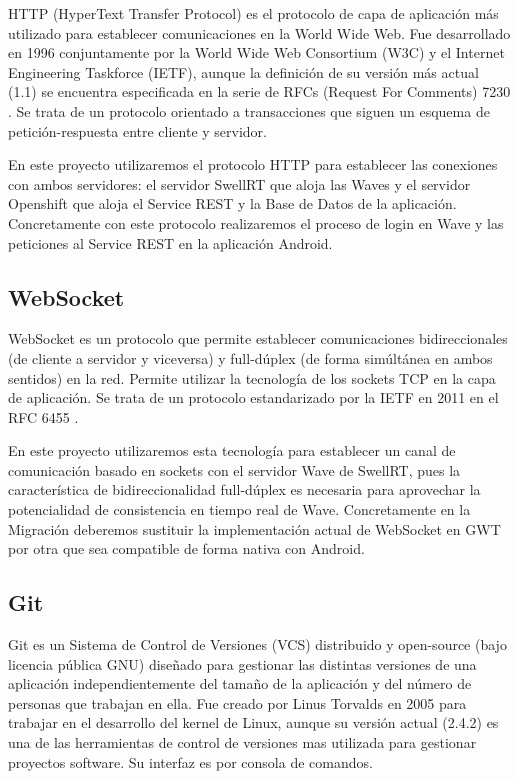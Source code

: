 	HTTP \cite{ref:HTTP} (HyperText Transfer Protocol) es el protocolo de capa de aplicación más utilizado para establecer comunicaciones en la World Wide Web. Fue desarrollado en 1996 conjuntamente por la World Wide Web Consortium (W3C) y el Internet Engineering Taskforce (IETF), aunque la definición de su versión más actual (1.1) se encuentra especificada en la serie de RFCs (Request For Comments) 7230 \cite{ref:HTTP}. Se trata de un protocolo orientado a transacciones que siguen un esquema de petición-respuesta entre cliente y servidor. 
	
	En este proyecto utilizaremos el protocolo HTTP para establecer las conexiones con ambos servidores: el servidor SwellRT que aloja las Waves y el servidor Openshift que aloja el Service REST y la Base de Datos de la aplicación. Concretamente con este protocolo realizaremos el proceso de login en Wave y las peticiones al Service REST en la aplicación Android.
    
    \subsection{WebSocket}\label{ssec:websocket}
    
	WebSocket \cite{ref:webSocket_ref} es un protocolo que permite establecer comunicaciones bidireccionales (de cliente a servidor y viceversa) y full-dúplex (de forma simúltánea en ambos sentidos) en la red. Permite utilizar la tecnología de los sockets TCP en la capa de aplicación.  Se trata de un protocolo estandarizado por la IETF en 2011 en el RFC 6455 \cite{ref:webSocket_ref}. 
	
	En este proyecto utilizaremos esta tecnología para establecer un canal de comunicación basado en sockets con el servidor Wave de SwellRT, pues la característica de bidireccionalidad full-dúplex es necesaria para aprovechar la potencialidad de consistencia en tiempo real de Wave. Concretamente en la Migración deberemos sustituir la implementación actual de WebSocket en GWT por otra que sea compatible de forma nativa con Android.
    
    \subsection{Git}\label{ssec:git} 
    
	Git \cite{ref:git} es un Sistema de Control de Versiones (VCS) distribuido y open-source (bajo licencia pública GNU) diseñado para gestionar las distintas versiones de una aplicación independientemente del tamaño de la aplicación y del número de personas que trabajan en ella. Fue creado por Linus Torvalds en 2005 para trabajar en el desarrollo del kernel de Linux, aunque  su versión actual (2.4.2) es una de las herramientas  de control de versiones mas utilizada para gestionar proyectos software. Su interfaz es por consola de comandos.
	
